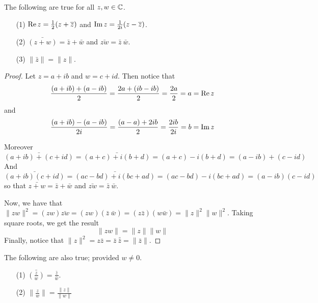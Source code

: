 \begin{lemma}\label{1.1.3}
    The following are true for all $z,w \in \mathbb{C}$.
    \begin{enumerate}
        \item[(1)] $\operatorname{Re}{z}=\frac{1}{2}(z+\overline{z})$ and
            $\operatorname{Im}{z}=\frac{1}{2i}(z-\overline{z})$.

        \item[(2)] $\bar{(z+w)}=\bar{z}+\bar{w}$ and $\bar{zw}=\bar{z} \
            \bar{w}$.

        \item[(3)] $\|\bar{z}\|=\|z\|$.
    \end{enumerate}
\end{lemma}
\begin{proof}
    Let $z=a+ib$ and  $w=c+id$. Then notice that
    \begin{equation*}
        \frac{(a+ib)+(a-ib)}{2}=\frac{2a+(ib-ib)}{2}=\frac{2a}{2}=a=\operatorname{Re}{z}
    \end{equation*}
    and
    \begin{equation*}
        \frac{(a+ib)-(a-ib)}{2i}=\frac{(a-a)+2ib}{2}=\frac{2ib}{2i}=b=\operatorname{Im}{z}
    \end{equation*}

    Moreover
    \begin{equation*}
        \bar{(a+ib)+(c+id)}=\bar{(a+c)+i(b+d)}=(a+c)-i(b+d)=(a-ib)+(c-id)
    \end{equation*}
    And
    \begin{equation*}
        \bar{(a+ib)(c+id)}=\bar{(ac-bd)+i(bc+ad)}=(ac-bd)-i(bc+ad)=(a-ib)(c-id)
    \end{equation*}
    so that $\bar{z+w}=\bar{z}+\bar{w}$ and $\bar{zw}=\bar{z} \ \bar{w}$.

    Now, we have that $\|zw\|^2=(zw)\bar{zw}=(zw)(\bar{z} \
    \bar{w})=(z\bar{z})(w\bar{w})=\|z\|^2\|w\|^2$. Taking square roots, we get
    the result
    \begin{equation*}
        \|zw\|=\|z\|\|w\|
    \end{equation*}
    Finally, notice that $\|z\|^2=z\bar{z}=\bar{z} \ \bar{\bar{z}}=\|\bar{z}\|$.
\end{proof}
\begin{corollary}
    The following are also true; provided $w \neq 0$.
    \begin{enumerate}
        \item[(1)] $\bar{(\frac{z}{w})}=\frac{\bar{z}}{\bar{w}}$.

        \item[(2)] $\|\frac{z}{w}\|=\frac{\|z\|}{\|w\|}$
    \end{enumerate}
\end{corollary}
